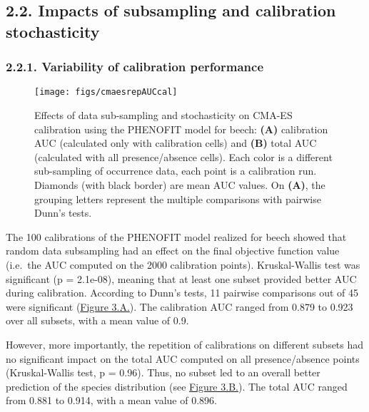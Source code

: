 \documentclass[11pt,]{article}
\begin{document}
\hypertarget{impacts-of-subsampling-and-calibration-stochasticity}{%
\subsection{2.2. Impacts of subsampling and calibration
stochasticity}\label{impacts-of-subsampling-and-calibration-stochasticity}}

\hypertarget{variability-of-calibration-performance}{%
\subsubsection{2.2.1. Variability of calibration
performance}\label{variability-of-calibration-performance}}

\begin{figure}[H]

{\centering \texttt{[image: figs/cmaesrepAUCcal]} 

}

\caption{\label{fig:cmaesrepAUCcal} Effects of data sub-sampling and stochasticity on CMA-ES calibration using the PHENOFIT model for beech: \textbf{(A)} calibration AUC (calculated only with calibration cells) and \textbf{(B)} total AUC (calculated with all presence/absence cells). Each color is a different sub-sampling of occurrence data, each point is a calibration run. Diamonds (with black border) are mean AUC values. On \textbf{(A)}, the grouping letters represent the multiple comparisons with pairwise Dunn’s tests.}\label{fig:cmaesrepAUCcal}
\end{figure}

The 100 calibrations of the PHENOFIT model realized for beech showed
that random data subsampling had an effect on the final objective
function value (i.e.~the AUC computed on the 2000 calibration points).
Kruskal-Wallis test was significant (p = 2.1e-08), meaning that at least
one subset provided better AUC during calibration. According to Dunn's
tests, 11 pairwise comparisons out of 45 were significant
(\hyperref[fig:cmaesrepAUCcal]{Figure 3.A.}). The calibration AUC ranged
from 0.879 to 0.923 over all subsets, with a mean value of 0.9.

However, more importantly, the repetition of calibrations on different
subsets had no significant impact on the total AUC computed on all
presence/absence points (Kruskal-Wallis test, p = 0.96). Thus, no subset
led to an overall better prediction of the species distribution (see
\hyperref[fig:cmaesrepAUCcal]{Figure 3.B.}). The total AUC ranged from
0.881 to 0.914, with a mean value of 0.896. \newline
\end{document}
